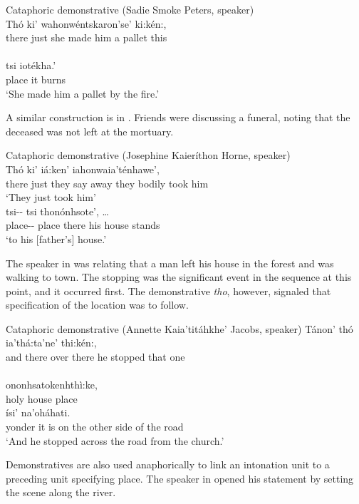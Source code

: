 \documentclass[output=paper,colorlinks,citecolor=brown]{langscibook}
\begin{document}
\ea \label{ex:mithun:8} Cataphoric demonstrative (Sadie Smoke Peters, speaker)\\
\gll Thó    ki' wahonwéntskaron'se'      ki:kén:,\\
     there  just  {she made him a pallet}  this  \\
\medskip\\
\gll tsi iotékha.'\\
place {it burns}\\
\glt `She made him a pallet by the fire.'
\z

A similar construction is in . Friends were discussing a funeral, noting that the deceased was not left at the mortuary.

\ea\label{ex:mithun:9}Cataphoric demonstrative (Josephine Kaieríthon Horne, speaker)\\
\gll Thó ki' iá:ken' iahonwaia'ténhawe',\\
there {just} {they say} {away they bodily took him}\\
\glt `They just took him'\medskip\\
\gll tsi-\/- tsi {thonónhsote',  \ldots }\\
     place-\/-  place {there his house stands}\\
\glt `to his {[}father's{]} house.'
\z

The speaker in  was relating that a man left his house in the forest and was walking to town. The stopping was the significant event in the sequence at this point, and it occurred first. The demonstrative \emph{tho}, however, signaled that specification of the location was to follow.


\ea \label{ex:mithun:10}Cataphoric demonstrative (Annette Kaia'titáhkhe' Jacobs, speaker)
\gll Tánon' thó ia'thá:ta'ne'             thi:kén:,\\ 
     and  there  {over there he stopped}  {that one}\\ 
\medskip\\
ononhsatokenhthì:ke,\\
holy house place\medskip\\
\gll ísi' na'oháhati.\\
yonder {it is on the other side of the road}\\
\glt `And he stopped across the road from the church.'
\z

Demonstratives are also used anaphorically to link an intonation unit to a preceding unit specifying place. The speaker in  opened his statement by setting the scene along the river.
\end{document}
